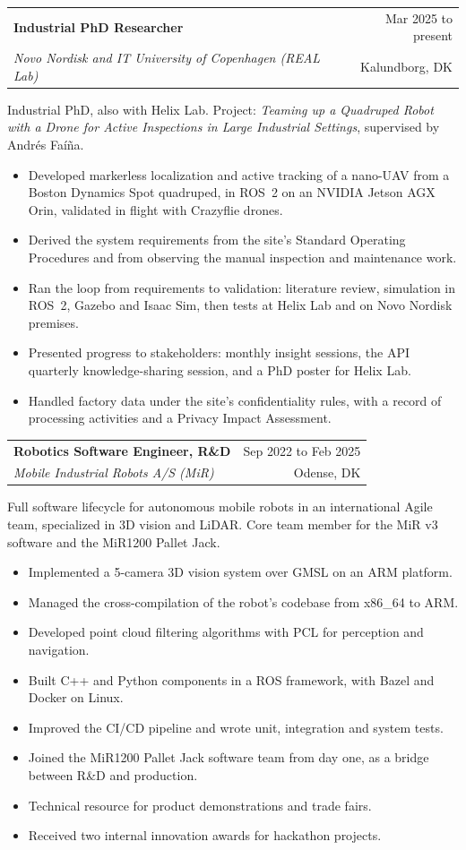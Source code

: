 \documentclass[a4paper,11pt]{article}
\makeatletter
\newcommand{\entry}[4]{%
    \noindent\begin{tabularx}{\linewidth}{@{}>{\raggedright\arraybackslash}X r@{}}
        \textbf{#1} & #2\\
        \textit{#3} & #4
    \end{tabularx}\par}
\makeatother
\begin{document}
\entry{Industrial PhD Researcher}{Mar 2025 to present}{Novo Nordisk and IT University of Copenhagen (REAL Lab)}{Kalundborg, DK}
Industrial PhD, also with Helix Lab. Project: \textit{Teaming up a Quadruped Robot with a Drone for Active Inspections in Large Industrial Settings}, supervised by Andrés Faíña.
\begin{itemize}
    \item Developed markerless localization and active tracking of a nano-UAV from a Boston Dynamics Spot quadruped, in ROS~2 on an NVIDIA Jetson AGX Orin, validated in flight with Crazyflie drones.
    \item Derived the system requirements from the site's Standard Operating Procedures and from observing the manual inspection and maintenance work.
    \item Ran the loop from requirements to validation: literature review, simulation in ROS~2, Gazebo and Isaac Sim, then tests at Helix Lab and on Novo Nordisk premises.
    \item Presented progress to stakeholders: monthly insight sessions, the API quarterly knowledge-sharing session, and a PhD poster for Helix Lab.
    \item Handled factory data under the site's confidentiality rules, with a record of processing activities and a Privacy Impact Assessment.
\end{itemize}

\entry{Robotics Software Engineer, R\&D}{Sep 2022 to Feb 2025}{Mobile Industrial Robots A/S (MiR)}{Odense, DK}
Full software lifecycle for autonomous mobile robots in an international Agile team, specialized in 3D vision and LiDAR. Core team member for the MiR v3 software and the MiR1200 Pallet Jack.
\begin{itemize}
    \item Implemented a 5-camera 3D vision system over GMSL on an ARM platform.
    \item Managed the cross-compilation of the robot's codebase from x86\_64 to ARM.
    \item Developed point cloud filtering algorithms with PCL for perception and navigation.
    \item Built C++ and Python components in a ROS framework, with Bazel and Docker on Linux.
    \item Improved the CI/CD pipeline and wrote unit, integration and system tests.
    \item Joined the MiR1200 Pallet Jack software team from day one, as a bridge between R\&D and production.
    \item Technical resource for product demonstrations and trade fairs.
    \item Received two internal innovation awards for hackathon projects.
\end{itemize}
\end{document}
